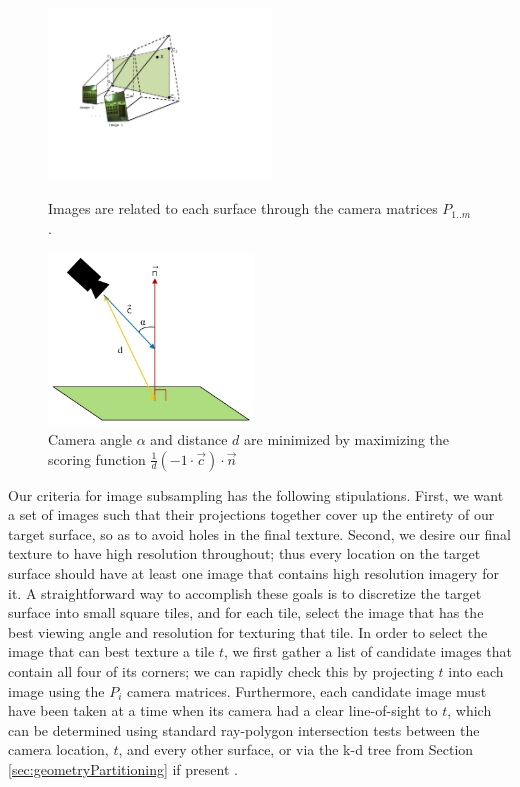 \documentclass[]{spie}  %
\begin{document}
\begin{figure}
  \begin{minipage}[b]{0.45\linewidth}
    \centering
    \includegraphics[height=1.8in]{Projection.pdf}
    \caption{Images are related to each surface through the camera
      matrices $P_{1..m}$. }
    \label{fig:projection}
  \end{minipage}
  \hspace{0.5cm}
  \begin{minipage}[b]{0.45\linewidth}
    \centering
    \includegraphics[height=1.8in]{scoringFunction.jpg}
    \caption{Camera angle $\alpha$ and distance $d$ are minimized by
      maximizing the scoring function $\frac{1}{d} (-1 \cdot \vec{c})
      \cdot \vec{n}$}
    \label{fig:scoringFunction}
  \end{minipage}
\end{figure}


Our criteria for image subsampling has the following
stipulations. First, we want a set of images such that their
projections together cover up the entirety of our target surface, so
as to avoid holes in the final texture. Second, we desire our final
texture to have high resolution throughout; thus every location on the
target surface should have at least one image that contains high
resolution imagery for it. A straightforward way to accomplish these
goals is to discretize the target surface into small square tiles, and
for each tile, select the image that has the best viewing angle and
resolution for texturing that tile. In order to select the image that
can best texture a tile $t$, we first gather a list of candidate
images that contain all four of its corners; we can rapidly check this
by projecting $t$ into each image using the $P_i$ camera
matrices. Furthermore, each candidate image must have been taken at a
time when its camera had a clear line-of-sight to $t$, which can be
determined using standard ray-polygon intersection tests between the
camera location, $t$, and every other surface, or via the k-d tree
from Section \ref{sec:geometryPartitioning} if present
\cite{rayintersection}.
\end{document}
